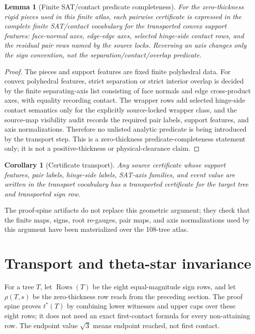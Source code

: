\documentclass[11pt,a4paper]{article}
\newtheorem{lemma}[theorem]{Lemma}
\newtheorem{corollary}[theorem]{Corollary}
\theoremstyle{definition}
\theoremstyle{remark}
\begin{document}
\begin{lemma}[Finite SAT/contact predicate completeness]
For the zero-thickness rigid pieces used in this finite atlas, each pairwise certificate is expressed in the complete finite SAT/contact vocabulary for the transported convex support features: face-normal axes, edge-edge axes, selected hinge-side contact rows, and the residual pair rows named by the source locks.  Reversing an axis changes only the sign convention, not the separation/contact/overlap predicate.
\end{lemma}

\begin{proof}
The pieces and support features are fixed finite polyhedral data.  For convex polyhedral features, strict separation or strict interior overlap is decided by the finite separating-axis list consisting of face normals and edge cross-product axes, with equality recording contact.  The wrapper rows add selected hinge-side contact semantics only for the explicitly source-locked wrapper class, and the source-map visibility audit records the required pair labels, support features, and axis normalizations.  Therefore no unlisted analytic predicate is being introduced by the transport step.  This is a zero-thickness predicate-completeness statement only; it is not a positive-thickness or physical-clearance claim.
\end{proof}

\begin{corollary}[Certificate transport]
Any source certificate whose support features, pair labels, hinge-side labels, SAT-axis families, and event value are written in the transport vocabulary has a transported certificate for the target tree and transported sign row.
\end{corollary}

The proof-spine artifacts do not replace this geometric argument; they check that the finite maps, signs, root re-gauges, pair maps, and axis normalizations used by this argument have been materialized over the 108-tree atlas.



\section{Transport and theta-star invariance}

For a tree \(T\), let \(\operatorname{Rows}(T)\) be the eight equal-magnitude sign rows, and let \(\rho(T,s)\) be the zero-thickness row reach from the preceding section.  The proof spine proves \(t^*(T)\) by combining lower witnesses and upper caps over these eight rows; it does not need an exact first-contact formula for every non-attaining row.  The endpoint value \(\sqrt{3}\) means endpoint reached, not first contact.
\end{document}
